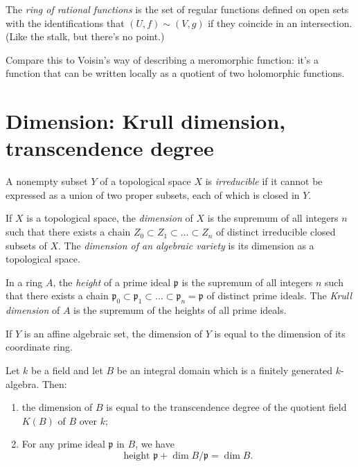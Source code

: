 \documentclass{book}
\begin{document}
\begin{definition}
\label{definition-rational-ring}
The {\it ring of rational
functions} is the set of regular functions
defined
on open sets with the identifications that
$(U,f)\sim(V,g)$
if they coincide in an intersection. (Like
the stalk,
but there's no point.)
\end{definition}

Compare this to Voisin's way of describing
a meromorphic function:
it's a function that can be written locally
as a quotient of two holomorphic functions.



\section{Dimension: Krull dimension,
transcendence degree}
\label{section-dimension}

\begin{definition}
\label{definition-irreducible-topological}
A nonempty subset $Y$ of a topological space
$X$
is {\it irreducible} if it cannot be
expressed
as a union of two proper subsets,
each of which is closed in $Y$.
\end{definition}

\begin{definition}
\label{definition-topol-space-dimen}
If $X$ is a topological space,
the {\it dimension} of $X$ is the supremum of
all integers $n$
such that there exists a chain
$Z_0 \subset Z_1\subset … \subset Z_n$
of distinct irreducible closed subsets of
$X$.
The {\it dimension of an algebraic variety}
is its dimension as a topological space.
\end{definition}

\begin{definition}
\label{definition-krull-dimension}
In a ring $A$, the {\it height} of a prime
ideal $\mathfrak{p}$
is the supremum of all integers $n$
such that there exists a chain
$\mathfrak{p}_0
\subset\mathfrak{p}
_1\subset…\subset\mathfrak{p}_n=\mathfrak{p}$
of distinct prime ideals.
The {\it Krull dimension} of $A$ is the
supremum of the heights
of all prime ideals.
\end{definition}

\begin{proposition}
\label{proposition-dimension}
If $Y$ is an affine algebraic set,
the dimension of $Y$ is equal to the
dimension
of its coordinate ring.
\end{proposition}

\begin{theorem}
\label{theorem-dimen-trans-degre}
Let $k$ be a field and let $B$ be an integral
domain
which is a finitely generated $k$-algebra.
Then:
\begin{enumerate}
\item the dimension of $B$ is equal to the
transcendence degree
of the quotient field $K(B)$ of $B$ over $k$;
\item For any prime ideal $\mathfrak{p}$ in
$B$, we have
$$
\text{height }\mathfrak{p}+ \dim B /
\mathfrak{p}=\dim B.
$$

\end{enumerate}
\end{theorem}
\end{document}

